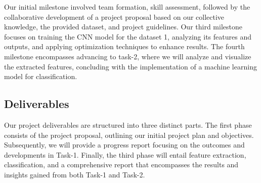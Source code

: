 \documentclass[10pt,twocolumn,letterpaper]{article}
\begin{document}
Our initial milestone involved team formation, skill assessment, followed by the collaborative development of a project proposal based on our collective knowledge, the provided dataset, and project guidelines. Our third milestone focuses on training the CNN model for the dataset 1, analyzing its features and outputs, and applying optimization techniques to enhance results. The fourth milestone encompasses advancing to task-2, where we will analyze and visualize the extracted features, concluding with the implementation of a machine learning model for classification.


\subsection{Deliverables}

Our project deliverables are structured into three distinct parts. The first phase consists of the project proposal, outlining our initial project plan and objectives. Subsequently, we will provide a progress report focusing on the outcomes and developments in Task-1. Finally, the third phase will entail feature extraction, classification, and a comprehensive report that encompasses the results and insights gained from both Task-1 and Task-2.





{\small


}
\end{document}
